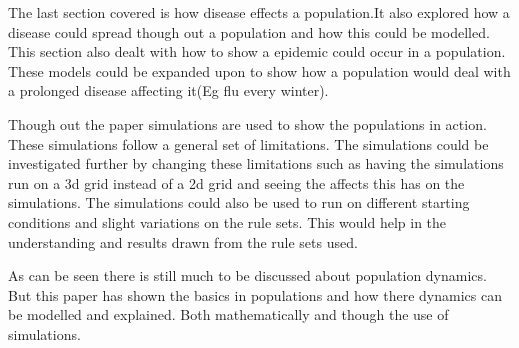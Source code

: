 \documentclass[final]{cmpreport}
\begin{document}
	The last section covered is how disease effects a population.It also explored how a disease could spread though out a population and how this could be modelled. This section also dealt with how to show a epidemic could occur in a population. These models could be expanded upon to show how a population would deal with a prolonged disease affecting it(Eg flu every winter).
	
	Though out the paper simulations are used to show the populations in action. These simulations follow a general set of limitations. The simulations could be investigated further by changing these limitations such as having the simulations run on a 3d grid instead of a 2d grid and seeing the affects this has on the simulations. The simulations could also be used to run on different starting conditions and slight variations on the rule sets. This would help in the understanding and results drawn from the rule sets used.
	
	As can be seen there is still much to be discussed about population dynamics. But this paper has shown the basics in populations and how there dynamics can be modelled and explained. Both mathematically and though the use of simulations.
	

	
	
\end{document}
